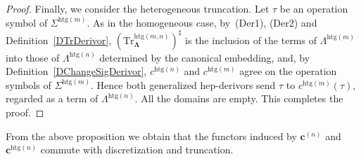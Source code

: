 \documentclass[a4paper, reqno]{amsbook}
\newcommand{\sig}[1]{\mathbf{#1}}             %
\newcommand{\htg}{\mathrm{htg}}                %
\newcommand{\Tr}{\mathrm{Tr}}
\theoremstyle{plain}
\theoremstyle{definition}
\begin{document}
\begin{proof}
Finally, we consider the heterogeneous truncation.
Let $\tau$ be an operation symbol of $\Sigma^{\htg(m)}$.
As in the homogeneous case, by~(Der1), (Der2) and Definition~\ref{DTrDerivor}, $(\Tr^{\htg(m,n)}_{\sig{\Lambda}})^{\sharp}$ is the inclusion of the terms of $\Lambda^{\htg(m)}$ into those of $\Lambda^{\htg(n)}$ determined by the canonical embedding, and, by Definition~\ref{DChangeSigDerivor}, $c^{\htg(n)}$ and $c^{\htg(m)}$ agree on the operation symbols of $\Sigma^{\htg(m)}$.
Hence both generalized hep-derivors send $\tau$ to $c^{\htg(m)}(\tau)$, regarded as a term of $\Lambda^{\htg(n)}$.
All the domains are empty. This completes the proof.
\end{proof}

From the above proposition we obtain that the functors induced by $\mathbf{c}^{(n)}$ and $\mathbf{c}^{\htg(n)}$ commute with discretization and truncation.
\end{document}
